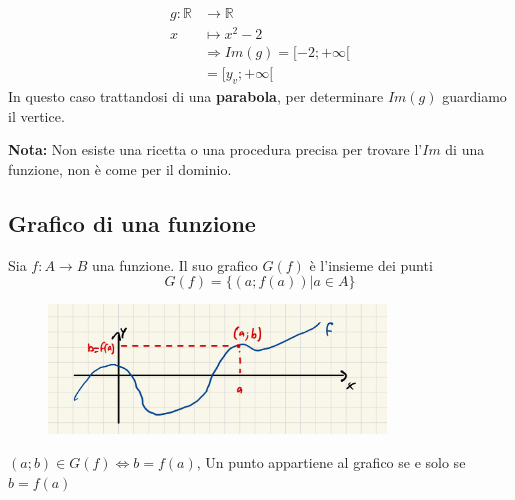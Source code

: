 \documentclass[../main.tex]{subfiles}
\begin{document}
\begin{center}
\end{center}

\begin{align*}
    g: \mathbb{R}& \longrightarrow \mathbb{R} \\
    x& \longmapsto x^2-2 \\
    &\Rightarrow Im(g)= \lbrack -2; + \infty \lbrack \\
    &= \lbrack y_v;+ \infty \lbrack
\end{align*}
In questo caso trattandosi di una \textbf{parabola}, per determinare $Im(g)$ guardiamo il vertice.

\textbf{Nota:} Non esiste una ricetta o una procedura precisa per trovare l'$Im$ di una funzione, non è come per il dominio.

\pagebreak
\subsection{Grafico di una funzione}
Sia $f:A \rightarrow B$ una funzione. Il suo grafico $G(f)$ è l'insieme dei punti 
$$
    G(f)= \{ (a;f(a)) | a \in A \}
$$

\begin{figure}[h]
    \centering
    \includegraphics[width=0.8\textwidth]{../images/graficoFunzione.jpeg}
\end{figure}
$(a;b) \in G(f) \Leftrightarrow b = f(a)$, Un punto appartiene al grafico se e solo se $b=f(a)$
\end{document}
